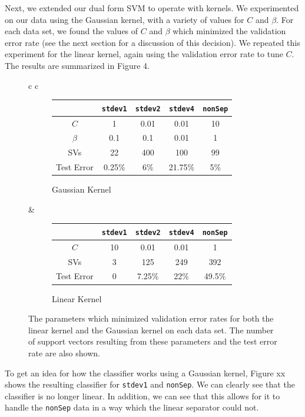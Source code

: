 \documentclass{sigchi}
\begin{document}
Next, we extended our dual form SVM to operate with kernels. We experimented on our data using the Gaussian kernel, with a variety of values for $C$ and $\beta$. For each data set, we found the values of $C$ and $\beta$ which minimized the validation error rate (see the next section for a discussion of this decision). We repeated this experiment for the linear kernel, again using the validation error rate to tune $C$. The results are summarized in Figure 4.

\begin{figure}
\centering
\renewcommand*{\arraystretch}{1.5}

\begin{tabular}{c c}
\begin{subfigure}[b]{3.5in}
\centering
	\begin{tabular}{| c | c | c | c | c |}
	\hline
	& \texttt{stdev1} & \texttt{stdev2} & \texttt{stdev4} & \texttt{nonSep}\\
	\hline
	$C$ & 1 & 0.01 & 0.01 & 10 \\
	\hline
	$\beta$ & 0.1 & 0.1 & 0.01 & 1 \\
	\hline
	SVs & 22 & 400 & 100 & 99 \\
	\hline
	Test Error & 0.25\% & 6\% & 21.75\% & 5\% \\
	\hline
	\end{tabular}
	\caption{Gaussian Kernel}
\end{subfigure}
&
\begin{subfigure}[b]{3.5in}
\centering
	\begin{tabular}{| c | c | c | c | c |}
	\hline
	& \texttt{stdev1} & \texttt{stdev2} & \texttt{stdev4} & \texttt{nonSep}\\
	\hline
	$C$ & 10 & 0.01 & 0.01 & 1 \\
	\hline
	SVs & 3 & 125 & 249 & 392 \\
	\hline
	Test Error & 0 & 7.25\% & 22\% & 49.5\%\\
	\hline
	\end{tabular}
	\caption{Linear Kernel}
\end{subfigure}
\end{tabular}

\caption{The parameters which minimized validation error rates for both the linear kernel and the Gaussian kernel on each data set. The number of support vectors resulting from these parameters and the test error rate are also shown.}
\end{figure}

To get an idea for how the classifier works using a Gaussian kernel, Figure xx shows the resulting classifier for \texttt{stdev1} and \texttt{nonSep}. We can clearly see that the classifier is no longer linear. In addition, we can see that this allows for it to handle the \texttt{nonSep} data in a way which the linear separator could not.
\end{document}
